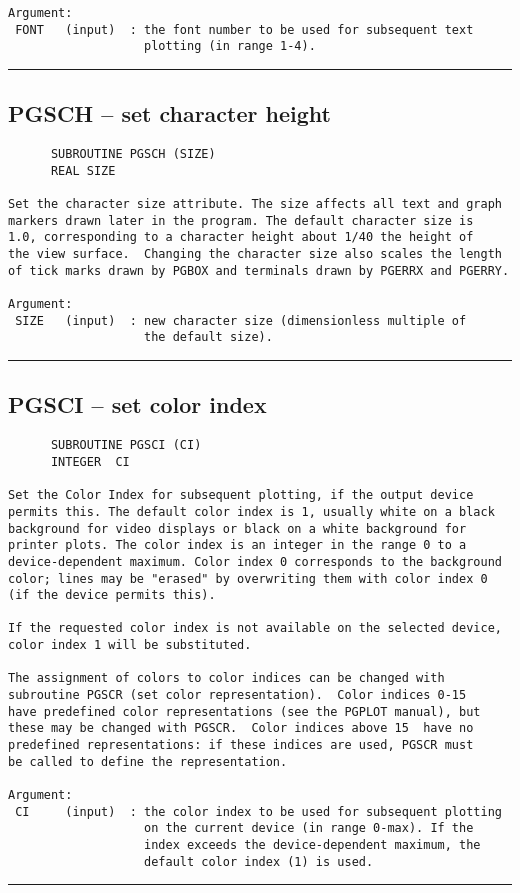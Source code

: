 {\begin{verbatim}
Argument:
 FONT   (input)  : the font number to be used for subsequent text
                   plotting (in range 1-4).
\end{verbatim}
\hrule


\subsection*{PGSCH -- set character height }
\begin{verbatim}
      SUBROUTINE PGSCH (SIZE)
      REAL SIZE

Set the character size attribute. The size affects all text and graph
markers drawn later in the program. The default character size is
1.0, corresponding to a character height about 1/40 the height of
the view surface.  Changing the character size also scales the length
of tick marks drawn by PGBOX and terminals drawn by PGERRX and PGERRY.

Argument:
 SIZE   (input)  : new character size (dimensionless multiple of
                   the default size).
\end{verbatim}
\hrule


\subsection*{PGSCI -- set color index }
\begin{verbatim}
      SUBROUTINE PGSCI (CI)
      INTEGER  CI

Set the Color Index for subsequent plotting, if the output device
permits this. The default color index is 1, usually white on a black
background for video displays or black on a white background for
printer plots. The color index is an integer in the range 0 to a
device-dependent maximum. Color index 0 corresponds to the background
color; lines may be "erased" by overwriting them with color index 0
(if the device permits this).

If the requested color index is not available on the selected device,
color index 1 will be substituted.

The assignment of colors to color indices can be changed with
subroutine PGSCR (set color representation).  Color indices 0-15
have predefined color representations (see the PGPLOT manual), but
these may be changed with PGSCR.  Color indices above 15  have no
predefined representations: if these indices are used, PGSCR must
be called to define the representation.

Argument:
 CI     (input)  : the color index to be used for subsequent plotting
                   on the current device (in range 0-max). If the
                   index exceeds the device-dependent maximum, the
                   default color index (1) is used.
\end{verbatim}
\hrule


}
